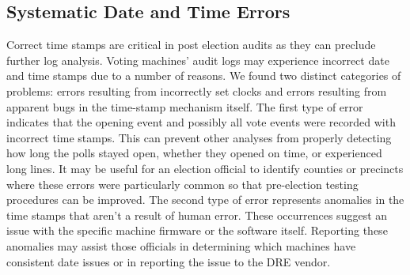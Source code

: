 \subsection{Systematic Date and Time Errors}\label{an:date} 

Correct time stamps are critical in post election audits as they can preclude further log analysis.  Voting machines' audit logs may experience incorrect date and time stamps due to a number of reasons.  We found two distinct categories of problems: errors resulting from incorrectly set clocks and errors resulting from apparent bugs in the time-stamp mechanism itself.  The first type of error indicates that the opening event and possibly all vote events were recorded with incorrect time stamps.  This can prevent other analyses from properly detecting how long the polls stayed open, whether they opened on time, or experienced long lines.  It may be useful for an election official to identify counties or precincts where these errors were particularly common so that pre-election testing procedures can be improved.  The second type of error represents anomalies in the time stamps that aren't a result of human error.  These occurrences suggest an issue with the specific machine firmware or the software itself.  Reporting these anomalies may assist those officials in determining which machines have consistent date issues or in reporting the issue to the DRE vendor.  

